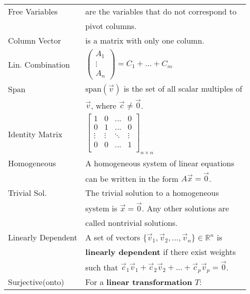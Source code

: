 \documentclass[5pt]{article}
\begin{document}
\begin{multicols}{2}
\begin{tabular}{ll}
    Free Variables          & are the variables that do not correspond to\\
                            & pivot columns.\\
    Column Vector           & is a matrix with only one column.\\
    Lin. Combination        & \footnotesize{$\begin{pmatrix}A_1\\ \vdots\\ A_n\end{pmatrix}=C_1 + ... + C_m$}\\
    Span                    & $\text{span}(\vec{v})$ is the set of all scalar multiples of\\
                            & $\vec{v}$, where $\vec{c}\neq\vec{0}$. \\
    Identity Matrix         & \footnotesize{$\begin{bmatrix}
                                  1 & 0 & ... & 0 \\
                                  0 & 1 & ... & 0 \\
                                  \vdots & \vdots & \ddots & \vdots \\
                                  0 & 0 & ... & 1 \\
                                \end{bmatrix}_{n\times n}$}\\
   Homogeneous              & A homogeneous system of linear equations\\
                            & can be written in the form $A\vec{x}=\vec{0}$.\\
   Trivial Sol.             & The trivial solution to a homogeneous\\
                            & system is $\vec{x}=\vec{0}$. Any other solutions are\\
                            & called nontrivial solutions.\\
\small{Linearly Dependent}  & A set of vectors $\{\vec{v}_1, \vec{v}_2, ..., \vec{v}_n\}\in\mathbb{R}^n$ is\\
                            & \textbf{linearly dependent} if there exist weights\\
                            & such that $\vec{c}_1\vec{v}_1 + \vec{c}_2\vec{v}_2 + ... + \vec{c}_p\vec{v}_p=\vec{0}$.\\
\small{Surjective}\footnotesize{(onto)}                  & For a \textbf{linear transformation} $T$:\\

\end{tabular}
\end{multicols}
\end{document}
